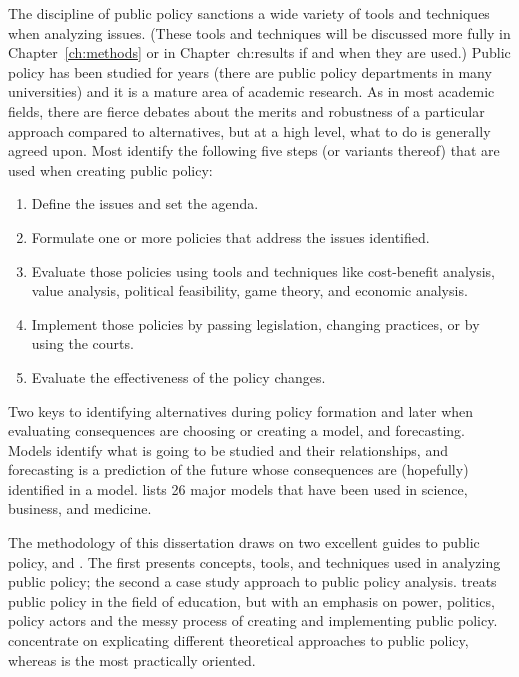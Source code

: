 The discipline of public policy sanctions a wide variety of tools and techniques when analyzing issues. (These tools and techniques will be discussed more fully in Chapter~\ref{ch:methods} or in Chapter~{ch:results} if and when they are used.) Public policy has been studied for years (there are public policy departments in many universities) and it is a mature area of academic research. As in most academic fields, there are fierce debates about the merits and robustness of a particular approach compared to alternatives, but at a high level, what to do is generally agreed upon. Most identify the following five steps (or variants thereof) that are used when creating public policy:

\begin{enumerate}
    \item Define the issues and set the agenda.
    \item Formulate one or more policies that address the issues identified.
    \item Evaluate those policies using tools and techniques like cost-benefit analysis, value analysis, political feasibility, game theory, and economic analysis.
    \item Implement those policies by passing legislation, changing practices, or by using the courts.
    \item Evaluate the effectiveness of the policy changes.
  \end{enumerate}
  
Two keys to identifying alternatives during policy formation and later when evaluating consequences are choosing or creating a model, and forecasting. Models identify what is going to be studied and their relationships, and forecasting is a prediction of the future whose consequences are (hopefully) identified in a model. \textcite{Page2018} lists 26 major models that have been used in science, business, and medicine.

The methodology of this dissertation draws on two excellent guides to public policy, \textcite{Clemons.McBeth2021} and \textcite{Gupta2011}. The first presents concepts, tools, and techniques used in analyzing public policy; the second a case study approach to public policy analysis. \textcite{Fowler2013} treats public policy in the field of education, but with an emphasis on power, politics, policy actors and the messy process of creating and implementing public policy. \citeauthor{Clemons.McBeth2021} concentrate on explicating different theoretical approaches to public policy, whereas \citeauthor{Gupta2011} is the most practically oriented.

